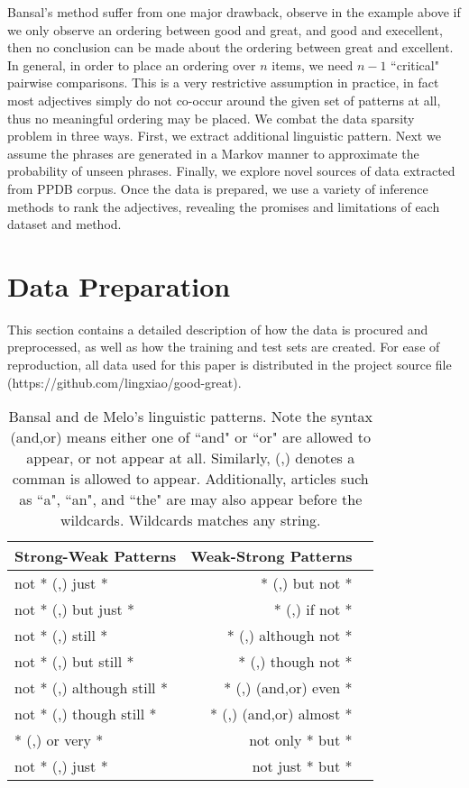 Bansal's method suffer from one major drawback, observe in the example above if we only observe an ordering between good and great, and good and execellent, then no conclusion can be made about the ordering between great and excellent. In general, in order to place an ordering over $n$ items, we need $n - 1$ ``critical" pairwise comparisons. This is a very restrictive assumption in practice, in fact most adjectives simply do not co-occur around the given set of patterns at all, thus no meaningful ordering may be placed. We combat the data sparsity problem in three ways. First, we extract additional linguistic pattern. Next we assume the phrases are generated in a Markov manner to approximate the probability of unseen phrases. Finally, we explore novel sources of data extracted from PPDB corpus. Once the data is prepared, we use a variety of inference methods to rank the adjectives, revealing the promises and limitations of each dataset and method.

\section{Data Preparation}

This section contains a detailed description of how the data is procured and preprocessed, as well as how the training and test sets are created. For ease of reproduction, all data used for this paper is distributed in the project source file (https://github.com/lingxiao/good-great).

\begin{table}
\small
\centering
\begin{tabular}{|l|rl|}
\hline \bf Strong-Weak Patterns & \bf Weak-Strong Patterns & \\ \hline
not  * (,) just *           &  * (,) but not *         & \\
not  * (,) but just *       &  * (,) if not *          & \\
not  * (,) still *          &  * (,) although not *    &  \\
not  * (,) but still *      &  * (,) though not *      & \\
not  * (,) although still * &  * (,) (and,or) even *   & \\
not  * (,) though still *   &  * (,) (and,or) almost * & \\
* (,) or very *             & not only * but *         & \\
not  * (,) just *           & not just * but *         & \\
\hline
\end{tabular}
\caption{\label{font-table} Bansal and de Melo's linguistic patterns. Note the syntax (and,or) means either one of ``and" or ``or" are allowed to appear, or not appear at all. Similarly, (,) denotes a comman is allowed to appear. Additionally, articles such as ``a", ``an", and ``the" are may also appear before the wildcards. Wildcards matches any string.}
\end{table}


